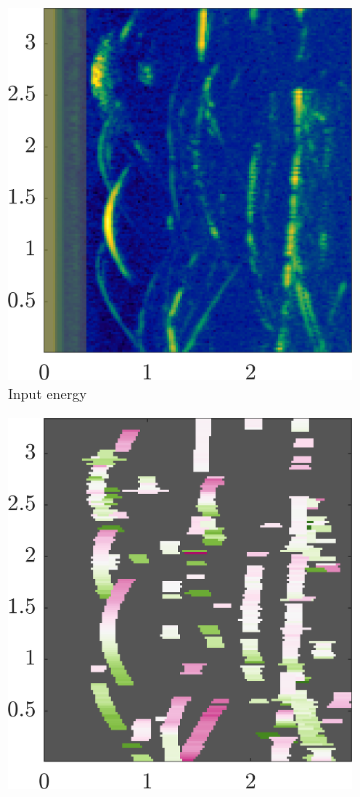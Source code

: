 \begin{figure}
    \begin{subfigure}[b]{0.25\textwidth}
        \centering
        \includegraphics[width=.9\textwidth]{gfx/results/basement_input.png}
        \caption{\small Input energy}
    \end{subfigure}%
    \begin{subfigure}[b]{0.25\textwidth}  
        \centering 
        \includegraphics[width=.9\textwidth]{gfx/results/basement_doppler.png}

\end{subfigure}
\end{figure}
